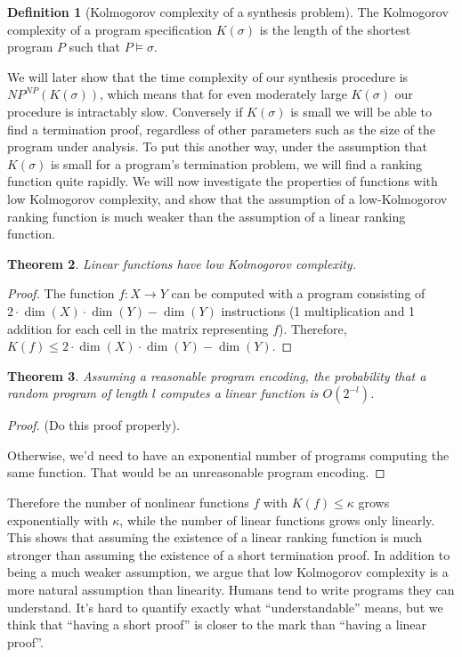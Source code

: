 \documentclass[preprint]{sigplanconf}
\newtheorem{theorem}{Theorem}
\theoremstyle{definition}
\newtheorem{definition}[theorem]{Definition}
\begin{document}
\begin{definition}[Kolmogorov complexity of a synthesis problem]
 The Kolmogorov complexity of a program specification $K(\sigma)$ is the length of the shortest
 program $P$ such that $P \models \sigma$.
\end{definition}

We will later show that the time complexity of our synthesis procedure is $NP^{NP}(K(\sigma))$,
which means that for even moderately large $K(\sigma)$ our procedure is intractably slow.  Conversely
if $K(\sigma)$ is small we will be able to find a termination proof, regardless of other parameters
such as the size of the program under analysis.  To put this another way, under the assumption
that $K(\sigma)$ is small for a program's termination problem, we will find a ranking function
quite rapidly.  We will now investigate the properties of functions with low Kolmogorov complexity,
and show that the assumption of a low-Kolmogorov ranking function is much weaker than the assumption
of a linear ranking function.


\begin{theorem}
 Linear functions have low Kolmogorov complexity.
\end{theorem}

\begin{proof}
 The function $f: X \to Y$ can be computed with a program consisting of
 $2 \cdot \dim(X) \cdot \dim(Y) - \dim(Y)$ instructions (1 multiplication and 1 addition for
 each cell in the matrix representing $f$).  Therefore,
 $K(f) \leq 2 \cdot \dim(X) \cdot \dim(Y) - \dim(Y)$.
\end{proof}

\begin{theorem}
Assuming a reasonable program encoding, the probability that a random program of length $l$ computes
a linear function is $O(2^{-l})$.
\end{theorem}

\begin{proof}
 (Do this proof properly).
 
 Otherwise, we'd need to have an exponential number of programs computing the same function.
 That would be an unreasonable program encoding.
\end{proof}


Therefore the number of nonlinear functions $f$ with $K(f) \leq \kappa$
grows exponentially with $\kappa$, while the number of linear functions
grows only linearly.  This shows that assuming the existence of a linear
ranking function is much stronger than assuming the existence of a short
termination proof.  In addition to being a much weaker assumption,
we argue that low Kolmogorov complexity is a more natural assumption than
linearity.  Humans tend to write programs they can understand.  It's hard
to quantify exactly what ``understandable'' means, but we think that
``having a short proof'' is closer to the mark than ``having a linear proof''.
\end{document}
